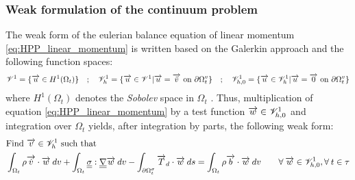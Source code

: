 \subsubsection*{Weak formulation of the continuum problem}
The weak form of the eulerian balance equation of linear momentum \eqref{eq:HPP_linear_momentum} is written based on the Galerkin approach and the following function spaces:
\begin{equation}
\mathscr{V}^1 = \{ {\overrightarrow{u}} \in H^1(\Omega_t) \}  \quad ; \quad \mathscr{V}^1_{h} = \{{\overrightarrow{u}} \in \mathscr{V}^1 | {\overrightarrow{u}}={\overrightarrow{\tilde{v}}} \text{ on } \partial \Omega_t^v \}  \quad ; \quad \mathscr{V}^1_{h,0} = \{{\overrightarrow{u}} \in \mathscr{V}_h^1 | {\overrightarrow{u}}={\overrightarrow{0}} \text{ on } \partial \Omega_t^v \} 
\end{equation}
where $H^1(\Omega_t)$ denotes the \textit{Sobolev} space in $\Omega_t$ \cite{Belytschko}. Thus, multiplication of equation \eqref{eq:HPP_linear_momentum} by a test function ${\overrightarrow{w}} \in \mathscr{V}^1_{h,0}$ and integration over $\Omega_t$ yields, after integration by parts, the following weak form:
\begin{equation}
  \label{eq:linear_momentum_weak_form}
  \begin{aligned}
    &\text{Find ${\overrightarrow{v}}\in \mathscr{V}_h^1$ such that} \\
    &\int_{\Omega_t}  \rho  {\overrightarrow{\dot{v}}} \cdot {\overrightarrow{w}}\: dv + \int_{\Omega_t}{\underline{\underline{\sigma}}}: 
    {\underline{\underline{\nabla}}} {\overrightarrow{w}} \:dv - \int_{\partial \Omega^\sigma_t} {\overrightarrow{T}}_d\cdot{\overrightarrow{w}}\: ds= \int_{\Omega_t} \rho {\overrightarrow{b}}\cdot {\overrightarrow{w}} \: dv  \qquad \forall \: {\overrightarrow{w}} \in \mathscr{V}_{h,0}^1, \forall\: t \in \tau
  \end{aligned}
\end{equation}

